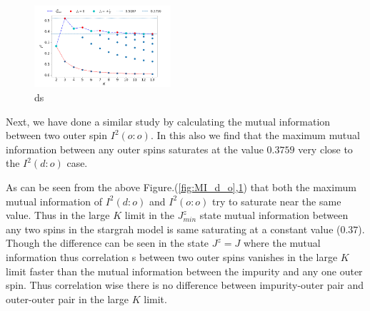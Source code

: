 \documentclass[reprint,prb,superscriptaddress]{revtex4-2}
\begin{document}
\begin{figure}[!htpb]
\includegraphics[width=0.45\textwidth]{plt/NEW31Dec_I_2_vs_Nch_[1,2]}
\caption{ds}
\label{fig:MI_o_o}
\end{figure}
Next, we have done a similar study by calculating the mutual information between two outer spin $I^2(o:o)$. In this also we find that the maximum mutual information between any outer spins saturates at the value $0.3759$ very close to the $I^2(d:o)$ case.

\par As can be seen from the above Figure.(\ref{fig:MI_d_o},\ref{fig:MI_o_o}) that  both the maximum mutual information of $I^2(d:o)$ and $I^2(o:o)$ try to saturate near the same value. Thus in the large $K$ limit in the $J^z_{min}$ state mutual information between any two spins in the stargrah model is same saturating at a constant value ($0.37$). Though the difference can be seen in the state $J^z=J$ where the mutual information thus correlation s between two outer spins vanishes in the large $K$ limit faster than the mutual information between the impurity and any one outer spin. Thus correlation wise there is no difference between impurity-outer pair and outer-outer pair in the large $K$ limit.
\end{document}
